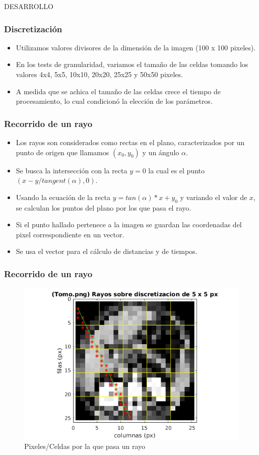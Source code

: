 \documentclass[11pt]{beamer}
\begin{document}
\begin{frame}{DESARROLLO}
\frametitle {Discretización}
\begin{itemize}
\item Utilizamos valores divisores de la dimensión de la imagen (100 x 100 pixeles).
\item En los tests de granularidad, variamos el tamaño de las celdas tomando los valores 4x4, 5x5, 10x10, 20x20, 25x25 y 50x50 pixeles.
\item A medida que se achica el tamaño de las celdas crece el tiempo de procesamiento, lo cual condicionó la elección de los parámetros.
\end{itemize}
\end{frame}


\begin{frame}
\frametitle{Recorrido de un rayo}
\begin{itemize}
\item Los rayos son considerados como rectas en el plano, caracterizados por un punto de origen que llamamos $(x_{0},y_{0})$ y un ángulo $\alpha$.
\item Se busca la intersección con la recta $y=0$ la cual es el punto $(x-y/tangent(\alpha),0)$.
\item Usando la ecuación de la recta $y=tan(\alpha)*x+y_{0}$ y variando el valor de $x$, se calculan los puntos del plano por los que pasa el rayo.
\item Si el punto hallado pertenece a la imagen se guardan las coordenadas del pixel correspondiente en un vector.
\item Se usa el vector para el cálculo de distancias y de tiempos.
\end{itemize}
\end{frame}


\begin{frame}
\frametitle{Recorrido de un rayo}
\begin{figure}[H]
    \centering
    \includegraphics[scale=0.5]{img/recorridorayo.png}
    \caption{Pixeles/Celdas por la que pasa un rayo}
    \label{fig:recorridorayo}
\end{figure}
\end{frame}
\end{document}
